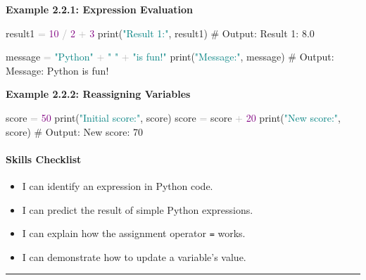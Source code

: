 \documentclass[
  justified,
  openright,
]{tufte-book}
\let\subsubsection\paragraph
\let\paragraph\paragraph
\newcommand{\BuiltInTok}[1]{#1}
\newcommand{\CommentTok}[1]{\textcolor{MidGray}{#1}}
\newcommand{\DecValTok}[1]{\textcolor{Purple}{#1}}
\newcommand{\NormalTok}[1]{#1}
\newcommand{\OperatorTok}[1]{\textcolor{DarkGray}{#1}}
\newcommand{\StringTok}[1]{\textcolor{Teal}{#1}}
\newenvironment{Shaded}{%
  \begin{snugshade}
}{%
  \end{snugshade}
}
\let\subsubsection\paragraph
\let\paragraph\paragraph
\providecommand{\tightlist}{%
  \setlength{\itemsep}{0pt}\setlength{\parskip}{0pt}}
\begin{document}
\textbf{Example 2.2.1: Expression Evaluation}

\begin{Shaded}
\begin{Highlighting}[]
\NormalTok{result1 }\OperatorTok{=} \DecValTok{10} \OperatorTok{/} \DecValTok{2} \OperatorTok{+} \DecValTok{3}
\BuiltInTok{print}\NormalTok{(}\StringTok{"Result 1:"}\NormalTok{, result1)   }\CommentTok{\# Output: Result 1: 8.0}

\NormalTok{message }\OperatorTok{=} \StringTok{"Python"} \OperatorTok{+} \StringTok{" "} \OperatorTok{+} \StringTok{"is fun!"}
\BuiltInTok{print}\NormalTok{(}\StringTok{"Message:"}\NormalTok{, message)    }\CommentTok{\# Output: Message: Python is fun!}
\end{Highlighting}
\end{Shaded}

\textbf{Example 2.2.2: Reassigning Variables}

\begin{Shaded}
\begin{Highlighting}[]
\NormalTok{score }\OperatorTok{=} \DecValTok{50}
\BuiltInTok{print}\NormalTok{(}\StringTok{"Initial score:"}\NormalTok{, score)}
\NormalTok{score }\OperatorTok{=}\NormalTok{ score }\OperatorTok{+} \DecValTok{20}
\BuiltInTok{print}\NormalTok{(}\StringTok{"New score:"}\NormalTok{, score)     }\CommentTok{\# Output: New score: 70}
\end{Highlighting}
\end{Shaded}

\subsubsection{Skills Checklist}\label{skills-checklist-8}

\begin{itemize}
\tightlist
\item[$\square$]
  I can identify an expression in Python code.
\item[$\square$]
  I can predict the result of simple Python expressions.
\item[$\square$]
  I can explain how the assignment operator \texttt{=} works.
\item[$\square$]
  I can demonstrate how to update a variable's value.
\end{itemize}

\begin{center}\rule{0.5\linewidth}{0.5pt}\end{center}
\end{document}
